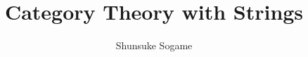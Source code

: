 \documentclass{article}
\title{Category Theory with Strings}
\author{Shunsuke Sogame}
\begin{document}
\maketitle










\nocite{*}


\end{document}
